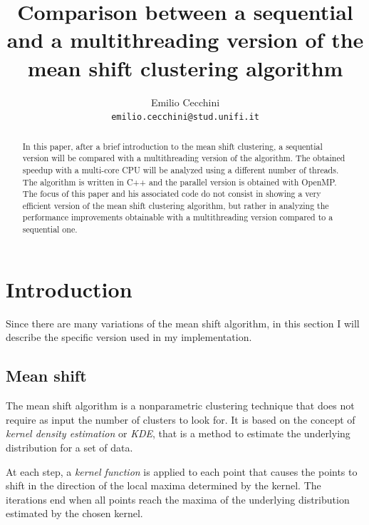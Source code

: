 \documentclass[10pt,twocolumn,letterpaper]{article}
\begin{document}
\title{Comparison between a sequential and a multithreading version of the mean shift clustering algorithm}

\author{Emilio Cecchini\\
{\tt\small emilio.cecchini@stud.unifi.it}
}


\maketitle
\thispagestyle{empty}


\begin{abstract}
In this paper, after a brief introduction to the mean shift clustering, a sequential version will be compared with a multithreading version of the algorithm. The obtained speedup with a multi-core CPU will be analyzed using a different number of threads. The algorithm is written in C++ and the parallel version is obtained with OpenMP. The focus of this paper and his associated code do not consist in showing a very efficient version of the mean shift clustering algorithm, but rather in analyzing the performance improvements obtainable with a  multithreading version compared to a sequential one.
\end{abstract}

\section{Introduction}

Since there are many variations of the mean shift algorithm, in this section I will describe the specific version used in my implementation.

\subsection{Mean shift}

The mean shift algorithm is a nonparametric clustering technique that does not require as input the number of clusters to look for.  It is based on the concept of \textit{kernel density estimation} or \textit{KDE}, that is a method to estimate the underlying distribution for a set of data.

At each step, a \textit{kernel function} is applied to each point that causes the points to shift in the direction of the local maxima determined by the kernel. The iterations end when all points reach the maxima of the underlying distribution estimated by the chosen kernel.
\end{document}
